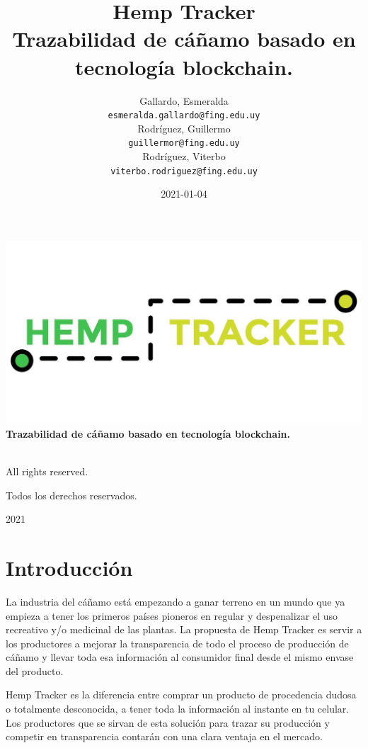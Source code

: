 \documentclass{article}
\title{
	\huge Hemp Tracker\\
	\normalsize Trazabilidad de cáñamo basado en tecnología blockchain.
}
\author{
	Gallardo, Esmeralda\\
	\texttt{esmeralda.gallardo@fing.edu.uy}\\
	Rodríguez, Guillermo\\
	\texttt{guillermor@fing.edu.uy}\\
	Rodríguez, Viterbo\\
	\texttt{viterbo.rodriguez@fing.edu.uy}
}
\date{2021-01-04}
\begin{document}
\makeatletter
\begin{titlepage}
	\begin{center}
		\includegraphics[width=\linewidth]{res/logotype.jpg}\\
		{\large \bfseries Trazabilidad de cáñamo basado en tecnología blockchain.}\\[1in]
		\@author\\[1in]
		{\large \@date}
	\end{center}
\end{titlepage}
\makeatother
\thispagestyle{empty}

\newpage

All rights reserved.

Todos los derechos reservados.

\textcopyright

2021
\newpage
{}
\tableofcontents
\newpage
{}
\setcounter{page}{1}
\section{Introducción}
La industria del cáñamo está empezando a ganar terreno en un mundo que ya empieza a tener los primeros países pioneros en regular y despenalizar el uso recreativo y/o medicinal de las plantas. La propuesta de Hemp Tracker es servir a los productores a mejorar la transparencia de todo el proceso de producción de cáñamo y llevar toda esa información al consumidor final desde el mismo envase del producto.

Hemp Tracker es la diferencia entre comprar un producto de procedencia dudosa o totalmente desconocida, a tener toda la información al instante en tu celular. Los productores que se sirvan de esta solución para trazar su producción y competir en transparencia contarán con una clara ventaja en el mercado.
\newpage
\end{document}
